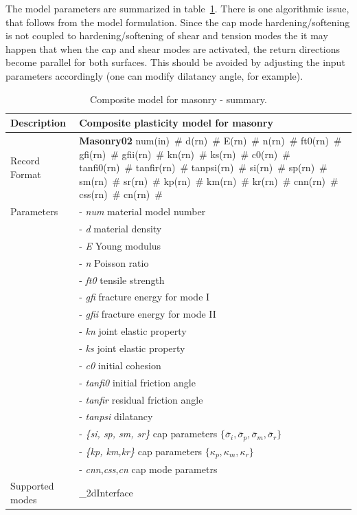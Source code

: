 \documentclass[a4paper]{article}
\newcommand{\descitem}[1]{{\noindent \bf #1}}
\newcommand{\elemparam}[2]{{{#1\tiny (#2)}~\#}}
\newcommand{\param}[1]{{\it #1}}
\begin{document}
The model parameters are summarized in table~\ref{compomasonry1_table}.
There is one algorithmic issue, that follows from the model
formulation. Since the cap mode hardening/softening is not coupled to
hardening/softening of shear and tension modes the it may happen that
when the cap and shear modes are activated, the return directions
become parallel for both surfaces. This should be avoided by adjusting
the input parameters accordingly (one can modify dilatancy angle, for example).

\begin{table}[!htb]
\begin{tabular}{|l|p{9cm}|}
\hline
Description & Composite plasticity model for masonry\\
\hline
Record Format & \descitem{Masonry02} \elemparam{num}{in} \elemparam{d}{rn} \elemparam{E}{rn}
\elemparam{n}{rn} \elemparam{ft0}{rn} \elemparam{gfi}{rn}
\elemparam{gfii}{rn}
\elemparam{kn}{rn} \elemparam{ks}{rn} \elemparam{c0}{rn}
\elemparam{tanfi0}{rn} \elemparam{tanfir}{rn} \elemparam{tanpsi}{rn}
\elemparam{si}{rn} \elemparam{sp}{rn} \elemparam{sm}{rn} \elemparam{sr}{rn}
\elemparam{kp}{rn} \elemparam{km}{rn} \elemparam{kr}{rn}
\elemparam{cnn}{rn} \elemparam{css}{rn} \elemparam{cn}{rn}\\
Parameters &- \param{num} material model number\\
&- \param{d} material density\\
&- \param{E} Young modulus\\
&- \param{n} Poisson ratio\\
&- \param{ft0} tensile strength\\
&- \param{gfi} fracture energy for mode I\\
&- \param{gfii} fracture energy for mode II\\
&- \param{kn} joint elastic property\\
&- \param{ks} joint elastic property\\
&- \param{c0} initial cohesion\\
&- \param{tanfi0} initial friction angle\\
&- \param{tanfir} residual friction angle\\
&- \param{tanpsi} dilatancy\\
&- \param{\{si, sp, sm, sr\}} cap parameters $\{\bar{\sigma}_i, \bar{\sigma}_p, \bar{\sigma}_m, \bar{\sigma}_r\}$\\
&- \param{\{kp, km,kr\}} cap parameters $\{\kappa_p, \kappa_m, \kappa_r\}$\\
&- \param{cnn},\param{css},\param{cn} cap mode parametrs\\
Supported modes& \_2dInterface\\
\hline
\end{tabular}
\caption{Composite model for masonry - summary.}
\label{compomasonry1_table}
\end{table}
\end{document}
